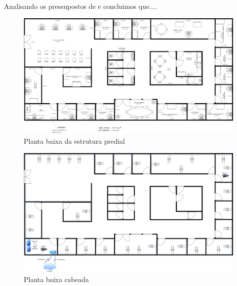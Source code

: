 \documentclass[	DIV=calc,%
							paper=a4,%
							fontsize=12pt,%
							onecolumn]{scrartcl}	 					%
\begin{document}
Analisando os pressupostos de \cite{ref3} e \cite{ref4} concluimos que....


\renewcommand\refname{} %

  

\begin{figure}
	\includegraphics[height=\textwidth,angle=-90,scale=0.8]{planta2d}
	\caption{Planta baixa da estrutura predial}
	\label{planta2d}
\end{figure}

\begin{figure}
	\includegraphics[height=\textwidth,angle=-90,scale=0.8]{planta2d_cabeada}
	\caption{Planta baixa cabeada}
	\label{planta2d_cabeada}
\end{figure}
\end{document}
